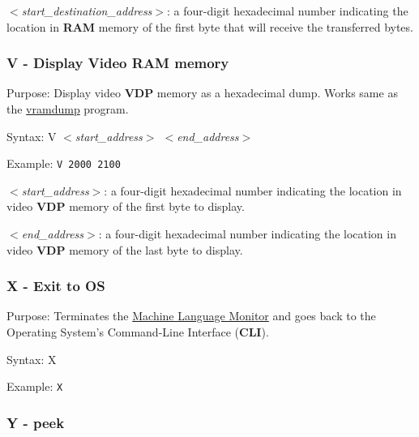         \hspace{1cm}\textit{$<$start\_destination\_address$>$}: a four-digit
        hexadecimal number indicating the location in \textbf{RAM} memory of the
        first byte that will receive the transferred bytes.

        \subsubsection{V - Display Video RAM memory}

        Purpose: Display video \textbf{VDP} memory as a hexadecimal dump. Works
        same as the \hyperref[software:vramdump]{vramdump} program.

        Syntax: V \textit{$<$start\_address$>$ $<$end\_address$>$}

        Example: \texttt{V 2000 2100}

        \hspace{1cm}\textit{$<$start\_address$>$}: a four-digit hexadecimal
        number indicating the location in video \textbf{VDP} memory of the first
        byte to display.

        \hspace{1cm}\textit{$<$end\_address$>$}: a four-digit hexadecimal
        number indicating the location in video \textbf{VDP} memory of the last
        byte to display.

        \subsubsection{X - Exit to OS}

        Purpose: Terminates the \hyperref[software:mlmonitor]
        {Machine Language Monitor} and goes back to the Operating System's
        Command-Line Interface (\textbf{CLI}).

        Syntax: X

        Example: \texttt{X}

        \subsubsection{Y - peek}

